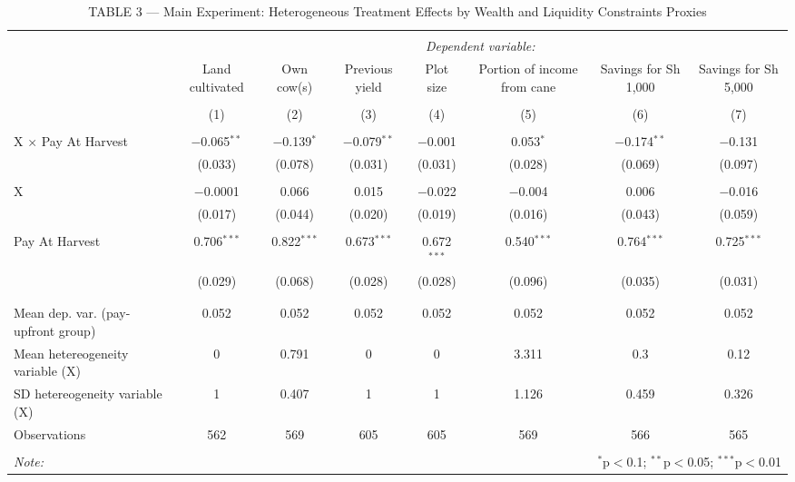 
\begin{table}[!htbp] \centering 
  \caption{TABLE 3 — Main Experiment: Heterogeneous Treatment Effects by Wealth and Liquidity Constraints Proxies} 
  \label{} 
\begin{tabular}{@{\extracolsep{5pt}}lccccccc} 
\\[-1.8ex]\hline 
\hline \\[-1.8ex] 
 & \multicolumn{7}{c}{\textit{Dependent variable:}} \\ 
\cline{2-8} 
 & Land cultivated & Own cow(s) & Previous yield & Plot size & Portion of income from cane & Savings for Sh 1,000 & Savings for Sh 5,000 \\ 
\\[-1.8ex] & (1) & (2) & (3) & (4) & (5) & (6) & (7)\\ 
\hline \\[-1.8ex] 
 X × Pay At Harvest & $-$0.065$^{**}$ & $-$0.139$^{*}$ & $-$0.079$^{**}$ & $-$0.001 & 0.053$^{*}$ & $-$0.174$^{**}$ & $-$0.131 \\ 
  & (0.033) & (0.078) & (0.031) & (0.031) & (0.028) & (0.069) & (0.097) \\ 
  & & & & & & & \\ 
 X & $-$0.0001 & 0.066 & 0.015 & $-$0.022 & $-$0.004 & 0.006 & $-$0.016 \\ 
  & (0.017) & (0.044) & (0.020) & (0.019) & (0.016) & (0.043) & (0.059) \\ 
  & & & & & & & \\ 
 Pay At Harvest & 0.706$^{***}$ & 0.822$^{***}$ & 0.673$^{***}$ & 0.672$^{***}$ & 0.540$^{***}$ & 0.764$^{***}$ & 0.725$^{***}$ \\ 
  & (0.029) & (0.068) & (0.028) & (0.028) & (0.096) & (0.035) & (0.031) \\ 
  & & & & & & & \\ 
\hline \\[-1.8ex] 
Mean dep. var. (pay-upfront group) & 0.052 & 0.052 & 0.052 & 0.052 & 0.052 & 0.052 & 0.052 \\ 
Mean hetereogeneity variable (X) & 0 & 0.791 & 0 & 0 & 3.311 & 0.3 & 0.12 \\ 
SD hetereogeneity variable (X) & 1 & 0.407 & 1 & 1 & 1.126 & 0.459 & 0.326 \\ 
Observations & 562 & 569 & 605 & 605 & 569 & 566 & 565 \\ 
\hline 
\hline \\[-1.8ex] 
\textit{Note:}  & \multicolumn{7}{r}{$^{*}$p$<$0.1; $^{**}$p$<$0.05; $^{***}$p$<$0.01} \\ 
\end{tabular} 
\end{table} 

